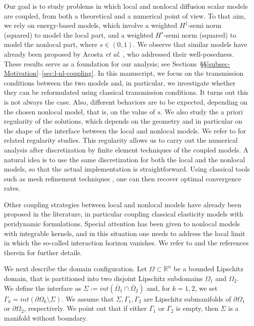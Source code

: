 \documentclass{amsart}
\newcommand{\Ol}{\Omega_{1}}%
\newcommand{\Onl}{\Omega_{2}}%
\newcommand{\Gl}{{\Gamma_1}}%
\newcommand{\Gnl}{{\Gamma_2}}%
\def\rn{{{\mathbb R}^n}}
\theoremstyle{plain}
\numberwithin{equation}{section}
\numberwithin{table}{section}
\numberwithin{figure}{section}
\numberwithin{theorem}{section}
\numberwithin{corollary}{section}
\numberwithin{definition}{section}
\numberwithin{lemma}{section}
\numberwithin{proposition}{section}
\numberwithin{remark}{section}
\begin{document}
Our goal is to study problems in which local and nonlocal diffusion scalar models are coupled, from both a theoretical and a numerical point of view. To that aim, we rely on energy-based models, which involve a weighted $H^1$-semi norm (squared) to model the local part, and a weighted $H^s$-semi norm (squared) to model the nonlocal part, where $s\in(0,1)$. We observe that similar models have already been proposed by Acosta {\em et al.} \cite{AcBeRo22, AcBeRo21}, who addressed their well-posedness. These results serve as a foundation for our analysis; see Sections~\S\S\ref{subsec-Motivation}--\ref{sec:l-nl-coupling}.
In this manuscript, we focus on the transmission conditions between the two models and,  in particular, we investigate whether they can be reformulated using classical transmission conditions. It turns out this is not always the case. Also, different behaviors are to be expected, depending on the chosen nonlocal model, that is, on the value of $s$.
We also study the a priori regularity of the solutions, which depends on the geometry and in particular on the shape of the interface between the local and nonlocal models. We refer to \cite{Kr-thesis, Kr15, GiStSt19, EsGiSt20} for related regularity studies. This regularity allows us to carry out the numerical analysis after discretization by finite element techniques of the coupled models. A natural idea is to use the same discretization for both the local and the nonlocal models, so that the actual implementation is straightforward. Using classical tools such as mesh refinement techniques \cite{AcBo17}, one can then recover optimal convergence rates. 

Other coupling strategies between local and nonlocal models have already been proposed in the literature, in particular coupling classical elasticity models with peridynamic formulations.
Special attention has been given to nonlocal models with integrable kernels, and in this situation one needs to address the local limit in which the so-called interaction horizon vanishes. We refer to \cite{DuLiLuTi18,CaDEBoGu20,DiPr22,DELiSeTiYu22} and the references therein for further details.

We next describe the domain configuration. Let $\Omega \subset \rn$ be a bounded Lipschitz domain, that is partitioned into two disjoint Lipschitz subdomains $\Ol$ and $\Onl$.
We define the interface as $\Sigma := int(\overline\Ol \cap \overline\Onl) $ and, for $k = 1,2$, we set $\Gamma_k=int(\partial\Omega_k\setminus \Sigma)$.
We assume that $\Sigma,\Gl,\Gnl$ are Lipschitz submanifolds of $\partial\Ol$ or $\partial\Onl$, respectively. 
We point out that if either $\Gl$ or $\Gnl$ is empty, then $\Sigma$ is a manifold without boundary.
\end{document}
